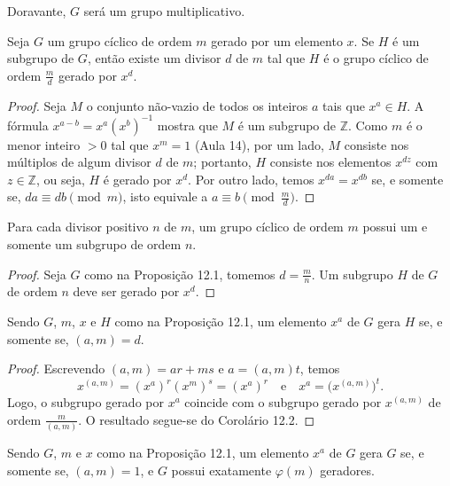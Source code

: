 Doravante, $G$ será um grupo multiplicativo.

\begin{proposicao}
Seja $G$ um grupo cíclico de ordem $m$ gerado por um elemento $x$. Se $H$ é um subgrupo de $G$, 
então existe um divisor $d$ de $m$ tal que $H$ é o grupo cíclico de ordem $\frac{m}{d}$ gerado 
por $x^d$.
\end{proposicao}

\begin{proof}
Seja $M$ o conjunto não-vazio de todos os inteiros $a$ tais que $x^a \in H$. A fórmula
$x^{a-b} = x^a (x^b)^{-1}$ mostra que $M$ é um subgrupo de $\mathbb{Z}$. Como $m$ é o menor inteiro 
$>0$ tal que $x^m = 1$ (Aula 14), por um lado, $M$ consiste nos múltiplos de algum divisor $d$ de 
$m$; portanto, $H$ consiste nos elementos $x^{dz}$ com $z \in \mathbb{Z}$, ou seja, $H$ é gerado por $x^d$.
Por outro lado, temos $x^{da} = x^{db}$ se, e somente se, $da \equiv db \pmod{m}$, isto equivale a 
$a \equiv b \pmod{\frac{m}{d}}$.
\end{proof}

\begin{corolario}
Para cada divisor positivo $n$ de $m$, um grupo cíclico de ordem $m$ possui um e somente um subgrupo de ordem $n$.
\end{corolario}

\begin{proof}
Seja $G$ como na Proposição 12.1, tomemos $d = \frac{m}{n}$. Um subgrupo $H$ de $G$ de ordem $n$ deve ser gerado por $x^d$.
\end{proof}

\begin{corolario}
Sendo $G$, $m$, $x$ e $H$ como na Proposição 12.1, um elemento $x^a$ de $G$ gera $H$ se, e somente se, $(a,m) = d$.
\end{corolario}

\begin{proof}
Escrevendo $(a,m) = ar + ms$ e $a = (a,m)t$, temos
\[
x^{(a,m)} = (x^a)^r (x^m)^s = (x^a)^r
\quad \text{e} \quad
x^a = \bigl(x^{(a,m)}\bigr)^t.
\]
Logo, o subgrupo gerado por $x^a$ coincide com o subgrupo gerado por $x^{(a,m)}$ de ordem
$\frac{m}{(a,m)}$. O resultado segue-se do Corolário 12.2.
\end{proof}

\begin{corolario}
Sendo $G$, $m$ e $x$ como na Proposição 12.1, um elemento $x^a$ de $G$ gera $G$ se, e somente se, $(a,m)=1$, e $G$ possui 
exatamente $\varphi(m)$ geradores.
\end{corolario}


